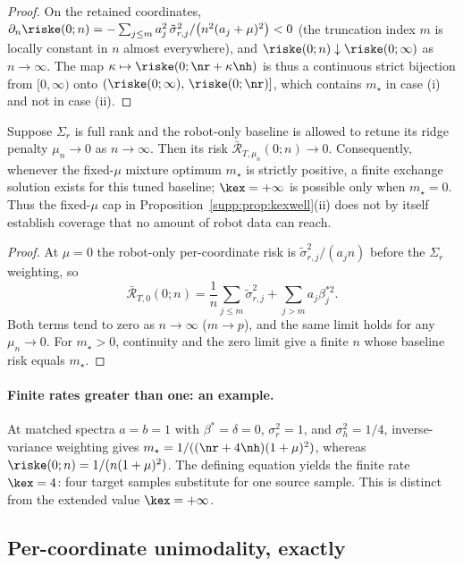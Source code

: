 \begin{proof}
On the retained coordinates, $\partial_n \riske(0; n) = -\sum_{j \le m} a_j^2\, \tilde\sigma_{r,j}^2 / \big(n^2 (a_j + \mu)^2\big) < 0$ (the truncation index $m$ is locally constant in $n$ almost everywhere), and $\riske(0; n) \downarrow \riske(0; \infty)$ as $n \to \infty$.
The map $\kappa \mapsto \riske(0; \nr + \kappa \nh)$ is thus a continuous strict bijection from $[0, \infty)$ onto $(\riske(0; \infty),\, \riske(0; \nr)]$, which contains $m_\star$ in case (i) and not in case (ii).
\end{proof}

\begin{proposition}
\label{supp:prop:tunedbaseline}
Suppose $\Sigma_r$ is full rank and the robot-only baseline is allowed to retune its ridge penalty $\mu_n\to0$ as $n\to\infty$.
Then its risk $\bar{\mathcal R}_{T,\mu_n}(0;n)\to0$.
Consequently, whenever the fixed-$\mu$ mixture optimum $m_\star$ is strictly positive, a finite exchange solution exists for this tuned baseline; $\kex=+\infty$ is possible only when $m_\star=0$.
Thus the fixed-$\mu$ cap in Proposition~\ref{supp:prop:kexwell}(ii) does not by itself establish coverage that no amount of robot data can reach.
\end{proposition}

\begin{proof}
At $\mu=0$ the robot-only per-coordinate risk is $\tilde\sigma_{r,j}^2/(a_j n)$ before the $\Sigma_r$ weighting, so
\[
\bar{\mathcal R}_{T,0}(0;n)=\frac1n\sum_{j\le m}\tilde\sigma_{r,j}^2+\sum_{j>m}a_j\beta_j^{*2}.
\]
Both terms tend to zero as $n\to\infty$ ($m\to p$), and the same limit holds for any $\mu_n\to0$.
For $m_\star>0$, continuity and the zero limit give a finite $n$ whose baseline risk equals $m_\star$.
\end{proof}

\paragraph{Finite rates greater than one: an example.}
At matched spectra $a=b=1$ with $\beta^*=\delta=0$, $\sigma_r^2=1$, and $\sigma_h^2=1/4$, inverse-variance weighting gives $m_\star=1/((\nr+4\nh)(1+\mu)^2)$, whereas $\riske(0;n)=1/(n(1+\mu)^2)$.
The defining equation yields the finite rate $\kex=4$: four target samples substitute for one source sample.
This is distinct from the extended value $\kex=+\infty$.

\subsection{Per-coordinate unimodality, exactly}

